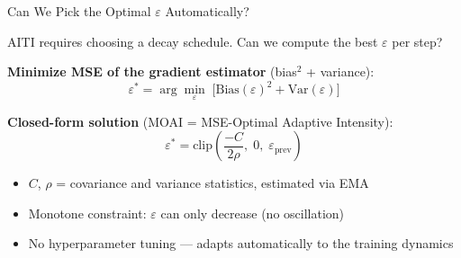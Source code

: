 \documentclass[aspectratio=169,10pt]{beamer}
\begin{document}
\begin{frame}{Can We Pick the Optimal $\varepsilon$ Automatically?}

AITI requires choosing a decay schedule. Can we compute the best $\varepsilon$ per step?

\vspace{0.2cm}
\textbf{Minimize MSE of the gradient estimator} (bias$^2$ + variance):
\[
\varepsilon^* = \arg\min_\varepsilon\; \bigl[\text{Bias}(\varepsilon)^2 + \text{Var}(\varepsilon)\bigr]
\]

\textbf{Closed-form solution} (MOAI = MSE-Optimal Adaptive Intensity):
\[
\varepsilon^* = \text{clip}\!\left(\frac{-C}{2\rho},\; 0,\; \varepsilon_{\text{prev}}\right)
\]

\begin{itemize}
    \item $C$, $\rho$ = covariance and variance statistics, estimated via EMA
    \item Monotone constraint: $\varepsilon$ can only decrease (no oscillation)
    \item No hyperparameter tuning --- adapts automatically to the training dynamics
\end{itemize}

\end{frame}
\end{document}
